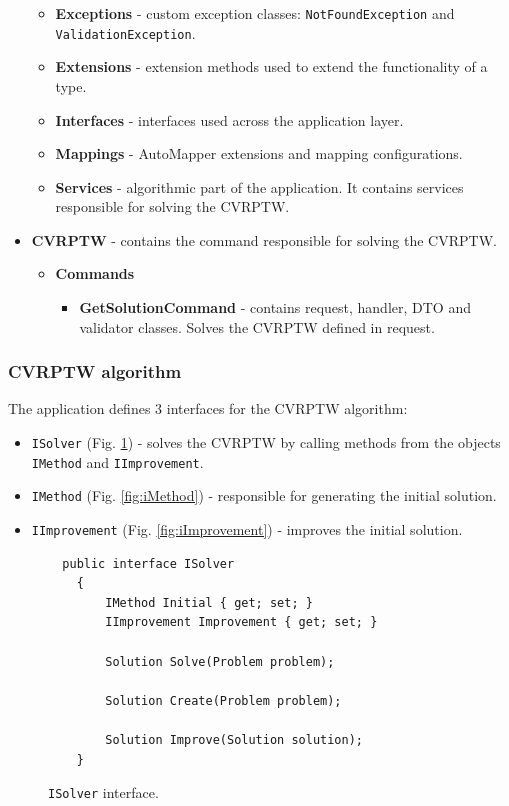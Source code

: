 \documentclass[a4paper,twoside,12pt]{book}
\begin{document}
\begin{itemize}
\begin{itemize}
        \item \textbf{Exceptions} - custom exception classes: \lstinline{NotFoundException} and \lstinline{ValidationException}.
        \item \textbf{Extensions} - extension methods used to extend the functionality of a type.
        \item \textbf{Interfaces} - interfaces used across the application layer.
        \item \textbf{Mappings} - AutoMapper extensions and mapping configurations.
        \item \textbf{Services} - algorithmic part of the application. It contains services responsible for solving the CVRPTW.
    \end{itemize}
\item \textbf{CVRPTW} - contains the command responsible for solving the CVRPTW.
    \begin{itemize}
        \item \textbf{Commands}
        \begin{itemize}
        \item \textbf{GetSolutionCommand} - contains request, handler, DTO and validator classes. Solves the CVRPTW defined in request.
    \end{itemize}
    \end{itemize}
\end{itemize}

\subsubsection{CVRPTW algorithm}
The application defines 3 interfaces for the CVRPTW algorithm:
\begin{itemize}
    \item \lstinline{ISolver} (Fig. \ref{fig:iSolver}) - solves the CVRPTW by calling methods from the objects \lstinline{IMethod} and \lstinline{IImprovement}.
    \item \lstinline{IMethod} (Fig. \ref{fig:iMethod}) - responsible for generating the initial solution.
    \item \lstinline{IImprovement} (Fig. \ref{fig:iImprovement}) - improves the initial solution.
\end{itemize}

\begin{figure}[H]
\centering
\begin{lstlisting}
  public interface ISolver
    {
        IMethod Initial { get; set; }
        IImprovement Improvement { get; set; }

        Solution Solve(Problem problem);

        Solution Create(Problem problem);

        Solution Improve(Solution solution);
    }
\end{lstlisting}
\caption{\lstinline{ISolver} interface.}
\label{fig:iSolver}
\end{figure}
\end{document}
